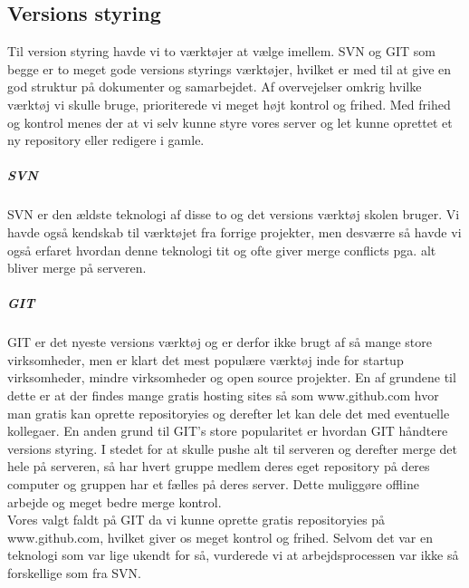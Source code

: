 \subsection*{Versions styring}
Til version styring havde vi to værktøjer at vælge imellem. SVN og GIT som begge er to meget gode versions styrings værktøjer, hvilket er med til at give en god struktur på dokumenter og samarbejdet. Af overvejelser omkrig hvilke værktøj vi skulle bruge, prioriterede vi meget højt kontrol og frihed. Med frihed og kontrol  menes der at vi selv kunne styre vores server og let kunne oprettet et ny repository eller redigere i gamle.

\subparagraph*{SVN}
SVN er den ældste teknologi af disse to og det versions værktøj skolen bruger. Vi havde også kendskab til værktøjet fra forrige projekter, men desværre så havde vi også erfaret hvordan denne teknologi tit og ofte giver merge conflicts pga. alt bliver merge på serveren. 

\subparagraph*{GIT}
GIT er det nyeste versions værktøj og er derfor ikke brugt af så mange store virksomheder, men er klart det mest populære værktøj inde for startup virksomheder, mindre virksomheder og open source projekter. En af grundene til dette er at der findes mange gratis hosting sites så som www.github.com hvor man gratis kan oprette repositoryies og derefter let kan dele det med eventuelle kollegaer. En anden grund til GIT's store popularitet er hvordan GIT håndtere versions styring. I stedet for at skulle pushe alt til serveren og derefter merge det hele på serveren, så har hvert gruppe medlem deres eget repository på deres computer og gruppen har et fælles på deres server. Dette muliggøre offline arbejde og meget bedre merge kontrol. \\

Vores valgt faldt på GIT da vi kunne oprette gratis repositoryies på www.github.com, hvilket giver os meget kontrol og frihed. Selvom det var en teknologi som var lige ukendt for så, vurderede vi at arbejdsprocessen var ikke så forskellige som fra SVN. 